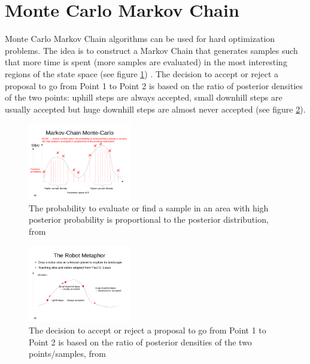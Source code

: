 \section{Monte Carlo Markov Chain} \label{sec:MCMC}

Monte Carlo Markov Chain algorithms can be used for hard optimization problems. The idea is to construct a Markov Chain that generates samples such that more time is spent (more samples are evaluated) in the most interesting regions of the state space (see figure \ref{fig:MCMC1}) \cite{MCMC}. The decision to accept or reject a proposal to go from Point 1 to Point 2 is based on the ratio of posterior densities of the two points: uphill steps are always accepted, small downhill steps are usually accepted but huge downhill steps are almost never accepted (see figure \ref{fig:MCMC2}). 


\begin{figure}
	\begin{center}
		\includegraphics[trim = 0cm 1.5cm 1cm 5.4cm, clip, width=0.4\textwidth]{lecture12-seiten-46}
	\end{center}
	\caption{The probability to evaluate or find a sample in an area with high posterior probability is proportional to the posterior distribution, from \cite{MCMC}}
	\label{fig:MCMC1}
\end{figure}

\begin{figure}
	\begin{center}
		\includegraphics[trim = 0cm 4cm 1cm 7cm, clip, width=0.4\textwidth]{lecture12-seiten-48}
	\end{center}
	\caption{The decision to accept or reject a proposal to go from Point 1 to Point 2 is based on the ratio of posterior densities of the two points/samples, from \cite{MCMC}}
	\label{fig:MCMC2}
\end{figure}